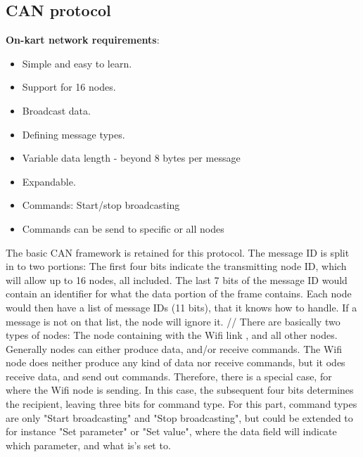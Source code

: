 
\subsection{CAN protocol}
\textbf{On-kart network requirements}:
\begin{itemize}
	\item Simple and easy to learn.
	\item Support for 16 nodes.
	\item Broadcast data.
	\item Defining message types.
	\item Variable data length - beyond 8 bytes per message
	\item Expandable.
	\item Commands: Start/stop broadcasting 
	\item Commands can be send to specific or all nodes
\end{itemize}

The basic CAN framework is retained for this protocol. 
The message ID is split in to two portions: The first four bits indicate the transmitting node ID, which will allow up to 16 nodes, all included. 
The last 7 bits of the message ID would contain an identifier for what the data portion of the frame contains.
Each node would then have a list of message IDs (11 bits), that it knows how to handle.
If a message is not on that list, the node will ignore it.
//
There are basically two types of nodes: The node containing with the Wifi link , and all other nodes.
Generally nodes can either produce data, and/or receive commands.
The Wifi node does neither produce any kind of data nor receive commands, but it odes receive data, and send out commands.
Therefore, there is a special case, for where the Wifi node is sending.
In this case, the subsequent four bits determines the recipient, leaving three bits for command type. 
For this part, command types are only "Start broadcasting" and "Stop broadcasting", but could be extended to for instance "Set parameter" or "Set value", where the data field will indicate which parameter, and what is's set to.


